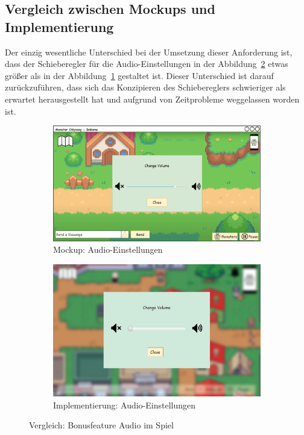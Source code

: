\subsection{Vergleich zwischen Mockups und Implementierung}\label{subsec:vergleich-zwischen-mockups-und-implementierung-audio-ingame}
Der einzig wesentliche Unterschied bei der Umsetzung dieser Anforderung ist, dass der Schieberegler für die Audio-Einstellungen in der Abbildung~\ref{fig: Implementierung: Audio-Einstellungen} etwas größer als in der Abbildung~\ref{fig: Mockup: Audio-Einstellungen} gestaltet ist. Dieser Unterschied ist  darauf zurückzuführen, dass sich das Konzipieren des Schiebereglers schwieriger als erwartet herausgestellt hat und aufgrund von Zeitprobleme weggelassen worden ist.
\begin{figure}[H]
    \centering
    \begin{subfigure}[b]{0.4\textwidth}
        \includegraphics[width=\textwidth]{images/mockups/Bonusfeatures/AudioIngame/AudioSettings.png}
        \caption{Mockup: \phantom{aaa} Audio-Einstellungen}
        \label{fig: Mockup: Audio-Einstellungen}
    \end{subfigure}
    \hfill
    \begin{subfigure}[b]{0.4\textwidth}
        \includegraphics[width=\textwidth]{images/implementation/Bonusfeatures/AudioIngame/audioingameimp.PNG}
        \caption{Implementierung: Audio-Einstellungen}
        \label{fig: Implementierung: Audio-Einstellungen}
    \end{subfigure}
    \caption{Vergleich: Bonusfeature Audio im Spiel}
    \label{fig: Vergleich: Bonusfeature Audio im Spiel}
\end{figure}
